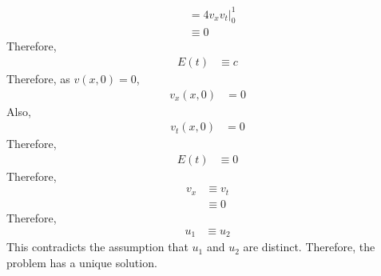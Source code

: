 \documentclass[fleqn, a4paper, 11pt, oneside]{amsart}
\theoremstyle{definition}
\theoremstyle{theorem}
\begin{document}
\begin{solution}
\begin{align*}
		&= \left. 4 v_x v_t \right|_{0}^{1}\\
		&\equiv 0
	\end{align*}
	Therefore,
	\begin{align*}
		E(t) &\equiv c
	\end{align*}
	Therefore, as $v(x,0) = 0$,
	\begin{align*}
		v_x(x,0) &= 0
	\end{align*}
	Also,
	\begin{align*}
		v_t(x,0) &= 0
	\end{align*}
	Therefore,
	\begin{align*}
		E(t) &\equiv 0
	\end{align*}
	Therefore,
	\begin{align*}
		v_x &\equiv v_t\\
		&\equiv 0
	\end{align*}
	Therefore,
	\begin{align*}
		u_1 &\equiv u_2
	\end{align*}
	This contradicts the assumption that $u_1$ and $u_2$ are distinct.
	Therefore, the problem has a unique solution.
\end{solution}
\end{document}
